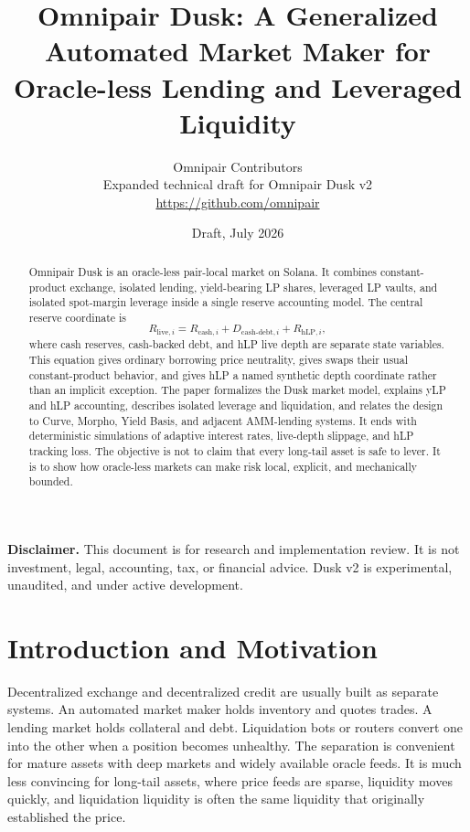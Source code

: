 \documentclass[11pt]{article}
\title{\vspace{-1.6em}Omnipair Dusk: A Generalized Automated Market Maker for Oracle-less Lending and Leveraged Liquidity}
\author{
  Omnipair Contributors\\[-0.25em]
  \small Expanded technical draft for Omnipair Dusk v2\\[-0.25em]
  \small \url{https://github.com/omnipair}
}
\date{Draft, July 2026}
\newcommand{\cash}{\mathrm{cash}}
\newcommand{\live}{\mathrm{live}}
\newcommand{\hlp}{\mathrm{hLP}}
\newcommand{\debt}{\mathrm{debt}}
\begin{document}
\maketitle
\vspace{-1.2em}

\begin{abstract}
Omnipair Dusk is an oracle-less pair-local market on Solana. It combines constant-product exchange, isolated lending, yield-bearing LP shares, leveraged LP vaults, and isolated spot-margin leverage inside a single reserve accounting model. The central reserve coordinate is
\[
R_{\live,i}=R_{\cash,i}+D_{\cash\text{-}\debt,i}+R_{\hlp,i},
\]
where cash reserves, cash-backed debt, and hLP live depth are separate state variables. This equation gives ordinary borrowing price neutrality, gives swaps their usual constant-product behavior, and gives hLP a named synthetic depth coordinate rather than an implicit exception. The paper formalizes the Dusk market model, explains yLP and hLP accounting, describes isolated leverage and liquidation, and relates the design to Curve, Morpho, Yield Basis, and adjacent AMM-lending systems. It ends with deterministic simulations of adaptive interest rates, live-depth slippage, and hLP tracking loss. The objective is not to claim that every long-tail asset is safe to lever. It is to show how oracle-less markets can make risk local, explicit, and mechanically bounded.
\end{abstract}

\textbf{Disclaimer.} This document is for research and implementation review. It is not investment, legal, accounting, tax, or financial advice. Dusk v2 is experimental, unaudited, and under active development.

\section{Introduction and Motivation}

Decentralized exchange and decentralized credit are usually built as separate systems. An automated market maker holds inventory and quotes trades. A lending market holds collateral and debt. Liquidation bots or routers convert one into the other when a position becomes unhealthy. The separation is convenient for mature assets with deep markets and widely available oracle feeds. It is much less convincing for long-tail assets, where price feeds are sparse, liquidity moves quickly, and liquidation liquidity is often the same liquidity that originally established the price.
\end{document}
